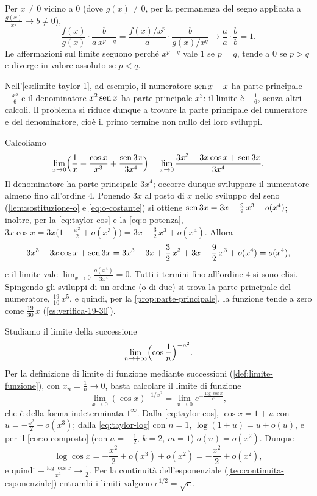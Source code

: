 \begin{dimostrazione}
Per $x\neq0$ vicino a $0$ (dove $g(x)\neq0$, per la permanenza del segno applicata a
$\frac{g(x)}{x^{q}}\to b\neq0$),
\[
  \frac{f(x)}{g(x)}\cdot\frac b{a\,x^{p-q}}=\frac{f(x)/x^{p}}{a}\cdot\frac{b}{g(x)/x^{q}}\longrightarrow\frac aa\cdot\frac bb=1 .
\]
Le affermazioni sul limite seguono perché $x^{p-q}$ vale $1$ se $p=q$, tende a $0$ se $p>q$
e diverge in valore assoluto se $p<q$.
\end{dimostrazione}

Nell'\cref{es:limite-taylor-1}, ad esempio, il numeratore $\operatorname{sen} x-x$ ha parte principale
$-\frac{x^{3}}6$ e il denominatore $x^{2}\operatorname{sen} x$ ha parte principale $x^{3}$: il limite è $-\frac16$, senza
altri calcoli. Il problema si riduce dunque a trovare la parte principale del numeratore
e del denominatore, cioè il primo termine non nullo dei loro sviluppi.

\begin{esempio}\label{es:limite-taylor-2}
Calcoliamo
\[
  \lim_{x\to0}\Bigl(\frac1x-\frac{\cos x}{x^{3}}+\frac{\operatorname{sen}3x}{3x^{4}}\Bigr)
  =\lim_{x\to0}\frac{3x^{3}-3x\cos x+\operatorname{sen}3x}{3x^{4}} .
\]
Il denominatore ha parte principale $3x^{4}$; occorre dunque sviluppare il numeratore
almeno fino all'ordine $4$. Ponendo $3x$ al posto di $x$ nello sviluppo del seno
(\cref{lem:sostituzione-o} e \eqref{eq:o-costante}) si ottiene $\operatorname{sen}3x=3x-\frac92\,x^{3}+o(x^{4})$;
inoltre, per la \eqref{eq:taylor-cos} e la \eqref{eq:o-potenza},
$3x\cos x=3x\bigl(1-\frac{x^{2}}2+o(x^{3})\bigr)=3x-\frac32\,x^{3}+o(x^{4})$. Allora
\[
  3x^{3}-3x\cos x+\operatorname{sen}3x=3x^{3}-3x+\frac32\,x^{3}+3x-\frac92\,x^{3}+o(x^{4})=o(x^{4}) ,
\]
e il limite vale $\lim_{x\to0}\frac{o(x^{4})}{3x^{4}}=0$. Tutti i termini fino all'ordine $4$ si sono
elisi. Spingendo gli sviluppi di un ordine (o di due) si trova la parte principale del
numeratore, $\frac{19}{10}\,x^{5}$, e quindi, per la \cref{prop:parte-principale}, la funzione
tende a zero come $\frac{19}{30}\,x$ (\cref{es:verifica-19-30}).
\end{esempio}

\begin{esempio}\label{es:limite-taylor-3}
Studiamo il limite della successione
\[
  \lim_{n\to+\infty}\Bigl(\cos\frac1n\Bigr)^{-n^{2}} .
\]
Per la definizione di limite di funzione mediante successioni (\cref{def:limite-funzione}),
con $x_{n}=\frac1n\to0$, basta calcolare il limite di funzione
\[
  \lim_{x\to0}(\cos x)^{-1/x^{2}}=\lim_{x\to0}e^{-\frac{\log\cos x}{x^{2}}} ,
\]
che è della forma indeterminata $1^{\infty}$. Dalla \eqref{eq:taylor-cos}, $\cos x=1+u$ con
$u=-\frac{x^{2}}2+o(x^{3})$; dalla \eqref{eq:taylor-log} con $n=1$, $\log(1+u)=u+o(u)$, e per il
\cref{cor:o-composto} (con $a=-\frac12$, $k=2$, $m=1$) $o(u)=o(x^{2})$. Dunque
\[
  \log\cos x=-\frac{x^{2}}2+o(x^{3})+o(x^{2})=-\frac{x^{2}}2+o(x^{2}) ,
\]
e quindi $-\frac{\log\cos x}{x^{2}}\to\frac12$. Per la continuità dell'esponenziale (\cref{teo:continuita-esponenziale}) entrambi i
limiti valgono $e^{1/2}=\sqrt e$.
\end{esempio}

